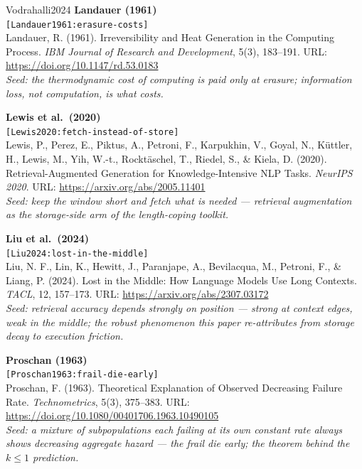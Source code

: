 \documentclass[11pt]{article}
\theoremstyle{remark}
\begin{document}
\begin{thebibliography}{Vodrahalli2024}
\textbf{Landauer (1961)}\\
{\small\texttt{[Landauer1961:erasure-costs]}}\\
Landauer, R. (1961). Irreversibility and Heat Generation in the Computing
Process. \emph{IBM Journal of Research and Development}, 5(3), 183--191.
URL: \url{https://doi.org/10.1147/rd.53.0183}\\
\emph{Seed: the thermodynamic cost of computing is paid only at erasure;
information loss, not computation, is what costs.}

\textbf{Lewis et al.\ (2020)}\\
{\small\texttt{[Lewis2020:fetch-instead-of-store]}}\\
Lewis, P., Perez, E., Piktus, A., Petroni, F., Karpukhin, V., Goyal, N.,
K{\"u}ttler, H., Lewis, M., Yih, W.-t., Rockt{\"a}schel, T., Riedel, S., \&
Kiela, D. (2020). Retrieval-Augmented Generation for Knowledge-Intensive NLP
Tasks. \emph{NeurIPS 2020}. URL: \url{https://arxiv.org/abs/2005.11401}\\
\emph{Seed: keep the window short and fetch what is needed --- retrieval
augmentation as the storage-side arm of the length-coping toolkit.}

\textbf{Liu et al.\ (2024)}\\
{\small\texttt{[Liu2024:lost-in-the-middle]}}\\
Liu, N. F., Lin, K., Hewitt, J., Paranjape, A., Bevilacqua, M., Petroni, F., \&
Liang, P. (2024). Lost in the Middle: How Language Models Use Long Contexts.
\emph{TACL}, 12, 157--173. URL: \url{https://arxiv.org/abs/2307.03172}\\
\emph{Seed: retrieval accuracy depends strongly on position --- strong at
context edges, weak in the middle; the robust phenomenon this paper
re-attributes from storage decay to execution friction.}

\textbf{Proschan (1963)}\\
{\small\texttt{[Proschan1963:frail-die-early]}}\\
Proschan, F. (1963). Theoretical Explanation of Observed Decreasing Failure
Rate. \emph{Technometrics}, 5(3), 375--383.
URL: \url{https://doi.org/10.1080/00401706.1963.10490105}\\
\emph{Seed: a mixture of subpopulations each failing at its own constant rate
always shows decreasing aggregate hazard --- the frail die early; the theorem
behind the $k \le 1$ prediction.}


\end{thebibliography}
\end{document}
